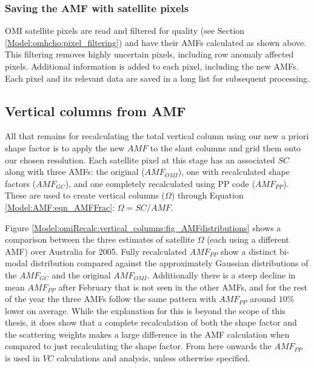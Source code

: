     
      
    \subsubsection{Saving the AMF with satellite pixels}
      
      OMI satellite pixels are read and filtered for quality (see Section \ref{Model:omhcho:pixel_filtering}) and have their AMFs calculated as shown above. 
      This filtering removes highly uncertain pixels, including row anomaly affected pixels.
      Additional information is added to each pixel, including the new AMFs.
      Each pixel and its relevant data are saved in a long list for subsequent processing.
    
  \subsection{Vertical columns from AMF}
    \label{Model:omiRecalc:vertical_columns}
    All that remains for recalculating the total vertical column using our new a priori shape factor is to apply the new $AMF$ to the slant columns and grid them onto our chosen resolution.
    Each satellite pixel at this stage has an associated $SC$ along with three AMFs: the original ($AMF_{OMI}$), one with recalculated shape factors ($AMF_{GC}$), and one completely recalculated using PP code ($AMF_{PP}$).
    These are used to create vertical columns ($\Omega$) through Equation \ref{Model:AMF:eqn_AMFFrac}: $\Omega = SC/AMF$.
    
    Figure \ref{Model:omiRecalc:vertical_columns:fig_AMFdistributions} shows a comparison between the three estimates of satellite $\Omega$ (each using a different AMF) over Australia for 2005. 
    Fully recalculated $AMF_{PP}$ show a distinct bi-modal distribution compared against the approximately Gaussian distributions of the $AMF_{GC}$ and the original $AMF_{OMI}$.
    Additionally there is a steep decline in mean $AMF_{PP}$ after February that is not seen in the other AMFs, and for the rest of the year the three AMFs follow the same pattern with $AMF_{PP}$ around $10\%$ lower on average.
    While the explanation for this is beyond the scope of this thesis, it does show that a complete recalculation of both the shape factor and the scattering weights makes a large difference in the AMF calculation when compared to just recalculating the shape factor.
    From here onwards the $AMF_{PP}$ is used in $VC$ calculations and analysis, unless otherwise specified.
    
